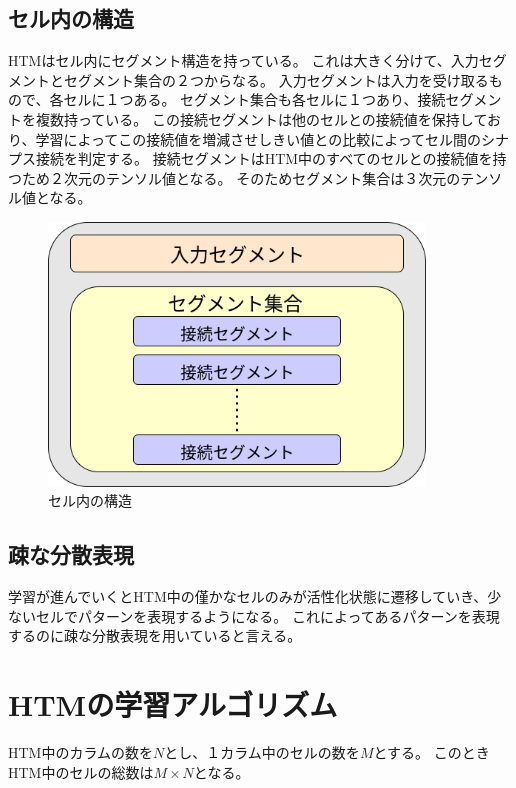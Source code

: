 \subsection{セル内の構造}
HTMはセル内にセグメント構造を持っている。
これは大きく分けて、入力セグメントとセグメント集合の２つからなる。
入力セグメントは入力を受け取るもので、各セルに１つある。
セグメント集合も各セルに１つあり、接続セグメントを複数持っている。
この接続セグメントは他のセルとの接続値を保持しており、学習によってこの接続値を増減させしきい値との比較によってセル間のシナプス接続を判定する。
接続セグメントはHTM中のすべてのセルとの接続値を持つため２次元のテンソル値となる。
そのためセグメント集合は３次元のテンソル値となる。

\vspace{5mm}
\begin{figure}[ht]
  \begin{center}
    \includegraphics[width=10cm]{./fig/drawing_4}
    \caption{セル内の構造}
    \label{fig:cell_structure}
  \end{center}
\end{figure}

\subsection{疎な分散表現}
学習が進んでいくとHTM中の僅かなセルのみが活性化状態に遷移していき、少ないセルでパターンを表現するようになる。
これによってあるパターンを表現するのに疎な分散表現を用いていると言える。

\section{HTMの学習アルゴリズム}

HTM中のカラムの数を$N$とし、１カラム中のセルの数を$M$とする。
このときHTM中のセルの総数は$M \times N$となる。

